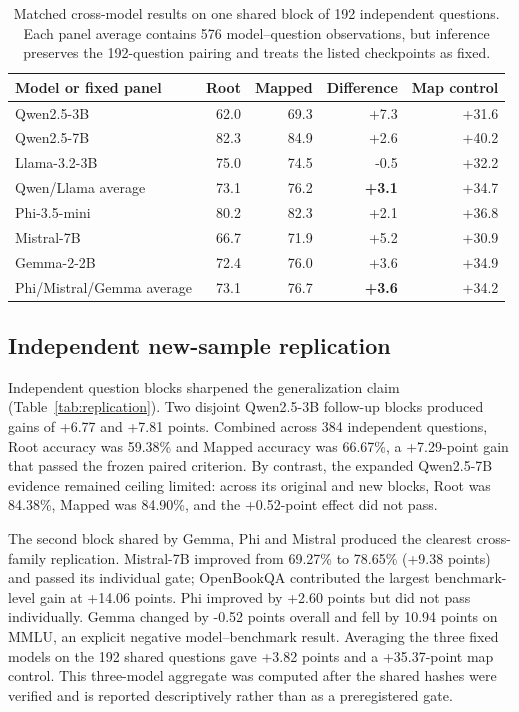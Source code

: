 \documentclass[11pt]{article}
\begin{document}
\begin{table}[H]
\centering\small
\caption{Matched cross-model results on one shared block of 192 independent questions. Each panel average contains 576 model--question observations, but inference preserves the 192-question pairing and treats the listed checkpoints as fixed.}
\label{tab:families}
\begin{tabular}{lrrrr}
\toprule
Model or fixed panel & Root & Mapped & Difference & Map control \\
\midrule
Qwen2.5-3B & 62.0 & 69.3 & +7.3 & +31.6 \\
Qwen2.5-7B & 82.3 & 84.9 & +2.6 & +40.2 \\
Llama-3.2-3B & 75.0 & 74.5 & -0.5 & +32.2 \\
Qwen/Llama average & 73.1 & 76.2 & \textbf{+3.1} & +34.7 \\
\midrule
Phi-3.5-mini & 80.2 & 82.3 & +2.1 & +36.8 \\
Mistral-7B & 66.7 & 71.9 & +5.2 & +30.9 \\
Gemma-2-2B & 72.4 & 76.0 & +3.6 & +34.9 \\
Phi/Mistral/Gemma average & 73.1 & 76.7 & \textbf{+3.6} & +34.2 \\
\bottomrule
\end{tabular}
\end{table}

\subsection{Independent new-sample replication}

Independent question blocks sharpened the generalization claim (Table~\ref{tab:replication}). Two disjoint Qwen2.5-3B follow-up blocks produced gains of +6.77 and +7.81 points. Combined across 384 independent questions, Root accuracy was 59.38\% and Mapped accuracy was 66.67\%, a +7.29-point gain that passed the frozen paired criterion. By contrast, the expanded Qwen2.5-7B evidence remained ceiling limited: across its original and new blocks, Root was 84.38\%, Mapped was 84.90\%, and the +0.52-point effect did not pass.

The second block shared by Gemma, Phi and Mistral produced the clearest cross-family replication. Mistral-7B improved from 69.27\% to 78.65\% (+9.38 points) and passed its individual gate; OpenBookQA contributed the largest benchmark-level gain at +14.06 points. Phi improved by +2.60 points but did not pass individually. Gemma changed by -0.52 points overall and fell by 10.94 points on MMLU, an explicit negative model--benchmark result. Averaging the three fixed models on the 192 shared questions gave +3.82 points and a +35.37-point map control. This three-model aggregate was computed after the shared hashes were verified and is reported descriptively rather than as a preregistered gate.
\end{document}
